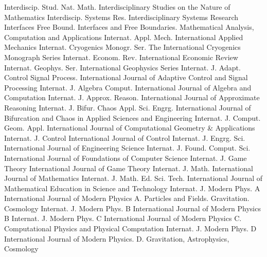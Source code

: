 {Interdiscip. Stud. Nat. Math.}
{Interdisciplinary Studies on the Nature of Mathematics}
{Interdiscip. Systems Res.}
{Interdisciplinary Systems Research}
{Interfaces Free Bound.}
{Interfaces and Free Boundaries. Mathematical Analysis, Computation and Applications}
{Internat. Appl. Mech.}
{International Applied Mechanics}
{Internat. Cryogenics Monogr. Ser.}
{The International Cryogenics Monograph Series}
{Internat. Econom. Rev.}
{International Economic Review}
{Internat. Geophys. Ser.}
{International Geophysics Series}
{Internat. J. Adapt. Control Signal Process.}
{International Journal of Adaptive Control and Signal Processing}
{Internat. J. Algebra Comput.}
{International Journal of Algebra and Computation}
{Internat. J. Approx. Reason.}
{International Journal of Approximate Reasoning}
{Internat. J. Bifur. Chaos Appl. Sci. Engrg.}
{International Journal of Bifurcation and Chaos in Applied Sciences and Engineering}
{Internat. J. Comput. Geom. Appl.}
{International Journal of Computational Geometry & Applications}
{Internat. J. Control}
{International Journal of Control}
{Internat. J. Engrg. Sci.}
{International Journal of Engineering Science}
{Internat. J. Found. Comput. Sci.}
{International Journal of Foundations of Computer Science}
{Internat. J. Game Theory}
{International Journal of Game Theory}
{Internat. J. Math.}
{International Journal of Mathematics}
{Internat. J. Math. Ed. Sci. Tech.}
{International Journal of Mathematical Education in Science and Technology}
{Internat. J. Modern Phys. A}
{International Journal of Modern Physics A. Particles and Fields. Gravitation. Cosmology}
{Internat. J. Modern Phys. B}
{International Journal of Modern Physics B}
{Internat. J. Modern Phys. C}
{International Journal of Modern Physics C. Computational Physics and Physical Computation}
{Internat. J. Modern Phys. D}
{International Journal of Modern Physics. D. Gravitation, Astrophysics, Cosmology}
